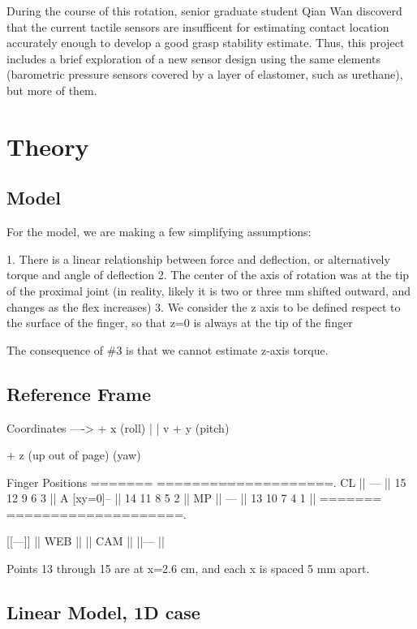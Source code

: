 \documentclass[preprint,12pt,3p]{elsarticle}
\begin{document}
During the course of this rotation, senior graduate student Qian Wan discoverd that the current tactile
sensors are insufficent for estimating contact location accurately enough to develop a good grasp
stability estimate. Thus, this project includes a brief exploration of a new sensor design using the
same elements (barometric pressure sensors covered by a layer of elastomer, such as urethane), but
more of them.

\section{Theory} \label{sec:firstpage}


\subsection{Model}

For the model, we are making a few simplifying assumptions:

1. There is a linear relationship between force and deflection, or alternatively torque and angle of
deflection
2. The center of the axis of rotation was at the tip of the proximal joint
(in reality, likely it is two or three mm shifted outward, and changes as the flex increases)
3. We consider the z axis to be defined respect to the surface of the finger, so that z=0 is always
at the tip of the finger

The consequence of \#3 is that we cannot estimate z-axis torque.

\subsection{Reference Frame}

\begin{ttlisting}[language=C++,breaklines]
Coordinates
----> + x (roll)
|
|
v
+ y (pitch)

+ z (up out of page) (yaw)


Finger Positions
=======      ====================.
 {CL}  || --- || 15  12  9  6  3 ||
 {A} [xy=0]-- || 14  11  8  5  2 ||
 {MP}  || --- || 13  10  7  4  1 ||
=======      ====================.


  [[---]]
||  WEB  ||
||  CAM  ||
  ||--- ||
  
Points 13 through 15 are at x=2.6 cm, and each x is spaced 5 mm apart.
\end{ttlisting}


\subsection{Linear Model, 1D case}
\end{document}
